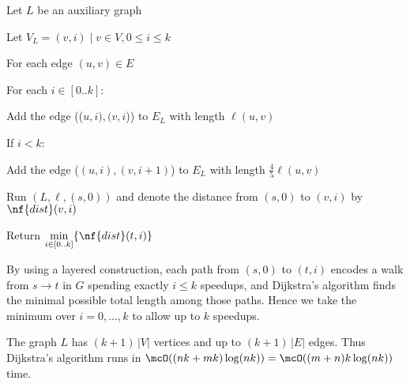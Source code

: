 \documentclass{article}
\begin{document}
\begin{solution}
\begin{steps}
  \item Let \( L \) be an auxiliary graph
  \item Let \( V_L = { (v, i) \mid v \in V, 0 \leq i \leq k } \) \begin{steps}
    \item For each edge \( (u,v)\in E \) \begin{steps}
      \item For each \( i\in[0..k] \): \begin{steps}
        \item Add the edge ((\( u,i ),( v,i \))) to \( E_L \) with length \( \ell(u,v) \)
        \item If \( i<k \): \begin{steps}
          \item Add the edge (\( (u, i), (v, i+1) \)) to \( E_L \) with length \( \frac{4}{5}\ell(u,v) \)
        \end{steps}
      \end{steps}
    \end{steps}
  \end{steps}
  \item Run \( (L,\ell,(s,0)) \) and denote the distance from \( (s,0) \) to \( (v,i) \) by \( \nf{dist}(v,i) \)
  \item Return \( \min\limits_{i\in[0..k]}\{\nf{dist}(t,i)\} \)
\end{steps}
By using a layered construction, each path from \( (s,0) \) to \( (t,i) \) encodes a walk from \( s\to t \) in \( G \) spending exactly \( i \leq k \) speedups, and Dijkstra's algorithm finds the minimal possible total length among those paths.
Hence we take the minimum over \( i=0,\dots,k \) to allow up to \( k \) speedups.

The graph \( L \) has \( (k+1)\,|V| \) vertices and up to \( (k+1)\,|E| \) edges.
Thus Dijkstra's algorithm runs in \( \mcO((nk + mk)\log(nk))=\mcO((m+n)k\log(nk)) \) time.


\end{solution}
\pagebreak
\end{document}
